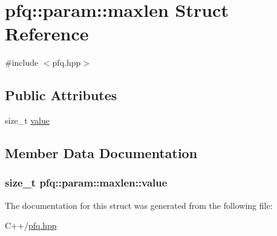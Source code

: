 \hypertarget{structpfq_1_1param_1_1maxlen}{\section{pfq\+:\+:param\+:\+:maxlen Struct Reference}
\label{structpfq_1_1param_1_1maxlen}
}


{\ttfamily \#include $<$pfq.\+hpp$>$}

\subsection*{Public Attributes}
\begin{DoxyCompactItemize}
\item 
size\+\_\+t \hyperlink{structpfq_1_1param_1_1maxlen_a693630abf4f41489a69836b661ea127d}{value}
\end{DoxyCompactItemize}


\subsection{Member Data Documentation}
\hypertarget{structpfq_1_1param_1_1maxlen_a693630abf4f41489a69836b661ea127d}{
\subsubsection[{value}]{\setlength{\rightskip}{0pt plus 5cm}size\+\_\+t pfq\+::param\+::maxlen\+::value}}\label{structpfq_1_1param_1_1maxlen_a693630abf4f41489a69836b661ea127d}


The documentation for this struct was generated from the following file\+:\begin{DoxyCompactItemize}
\item 
C++/\hyperlink{pfq_8hpp}{pfq.\+hpp}\end{DoxyCompactItemize}
